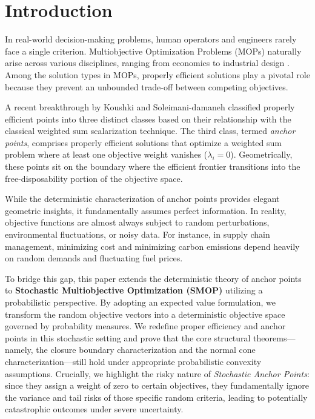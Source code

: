 \documentclass[twoside]{article}
\begin{document}
\section{Introduction}
In real-world decision-making problems, human operators and engineers rarely face a single criterion. Multiobjective Optimization Problems (MOPs) naturally arise across various disciplines, ranging from economics to industrial design \cite{miettinen1999}. Among the solution types in MOPs, properly efficient solutions play a pivotal role because they prevent an unbounded trade-off between competing objectives. 

A recent breakthrough by Koushki and Soleimani-damaneh \cite{koushki2018} classified properly efficient points into three distinct classes based on their relationship with the classical weighted sum scalarization technique. The third class, termed \textit{anchor points}, comprises properly efficient solutions that optimize a weighted sum problem where at least one objective weight vanishes ($\lambda_i = 0$). Geometrically, these points sit on the boundary where the efficient frontier transitions into the free-disposability portion of the objective space.

While the deterministic characterization of anchor points provides elegant geometric insights, it fundamentally assumes perfect information. In reality, objective functions are almost always subject to random perturbations, environmental fluctuations, or noisy data. For instance, in supply chain management, minimizing cost and minimizing carbon emissions depend heavily on random demands and fluctuating fuel prices.

To bridge this gap, this paper extends the deterministic theory of anchor points to \textbf{Stochastic Multiobjective Optimization (SMOP)} utilizing a probabilistic perspective. By adopting an expected value formulation, we transform the random objective vectors into a deterministic objective space governed by probability measures. We redefine proper efficiency and anchor points in this stochastic setting and prove that the core structural theorems—namely, the closure boundary characterization and the normal cone characterization—still hold under appropriate probabilistic convexity assumptions. Crucially, we highlight the risky nature of \textit{Stochastic Anchor Points}: since they assign a weight of zero to certain objectives, they fundamentally ignore the variance and tail risks of those specific random criteria, leading to potentially catastrophic outcomes under severe uncertainty.
\end{document}
